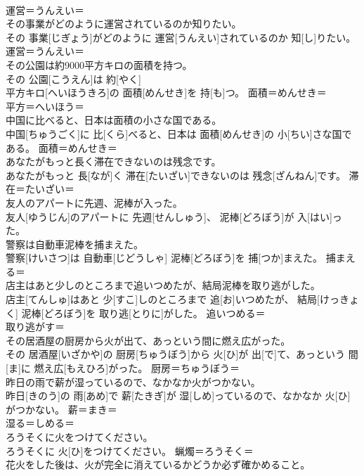 \documentclass[8pt]{extreport}
\begin{document}
\begin{CJK}{UTF8}{min}
\\	運営＝うんえい＝ 
\\	その事業がどのように運営されているのか知りたい。	
\\	その 事業[じぎょう]がどのように 運営[うんえい]されているのか 知[し]りたい。	運営＝うんえい＝ 
\\	その公園は約9000平方キロの面積を持つ。	
\\	その 公園[こうえん]は 約[やく] 
\\	平方キロ[へいほうきろ]の 面積[めんせき]を 持[も]つ。	面積＝めんせき＝ 
\\	平方＝へいほう＝ 
\\	中国に比べると、日本は面積の小さな国である。	
\\	中国[ちゅうごく]に 比[くら]べると、日本は 面積[めんせき]の 小[ちい]さな国である。	面積＝めんせき＝ 
\\	あなたがもっと長く滞在できないのは残念です。	
\\	あなたがもっと 長[なが]く 滞在[たいざい]できないのは 残念[ざんねん]です。	滞在＝たいざい＝ 
\\	友人のアパートに先週、泥棒が入った。	
\\	友人[ゆうじん]のアパートに 先週[せんしゅう]、 泥棒[どろぼう]が 入[はい]った。	
\\	警察は自動車泥棒を捕まえた。	
\\	警察[けいさつ]は 自動車[じどうしゃ] 泥棒[どろぼう]を 捕[つか]まえた。	捕まえる＝ 
\\	店主はあと少しのところまで追いつめたが、結局泥棒を取り逃がした。	
\\	店主[てんしゅ]はあと 少[すこ]しのところまで 追[お]いつめたが、 結局[けっきょく] 泥棒[どろぼう]を 取り逃[とりに]がした。	追いつめる＝ 
\\	取り逃がす＝ 
\\	その居酒屋の厨房から火が出て、あっという間に燃え広がった。	
\\	その 居酒屋[いざかや]の 厨房[ちゅうぼう]から 火[ひ]が 出[で]て、あっという 間[ま]に 燃え広[もえひろ]がった。	厨房＝ちゅうぼう＝ 
\\	昨日の雨で薪が湿っているので、なかなか火がつかない。	
\\	昨日[きのう]の 雨[あめ]で 薪[たきぎ]が 湿[しめ]っているので、なかなか 火[ひ]がつかない。	薪＝まき＝ 
\\	湿る＝しめる＝ 
\\	ろうそくに火をつけてください。	
\\	ろうそくに 火[ひ]をつけてください。	蝋燭＝ろうそく＝ 
\\	花火をした後は、火が完全に消えているかどうか必ず確かめること。	

\end{CJK}
\end{document}
